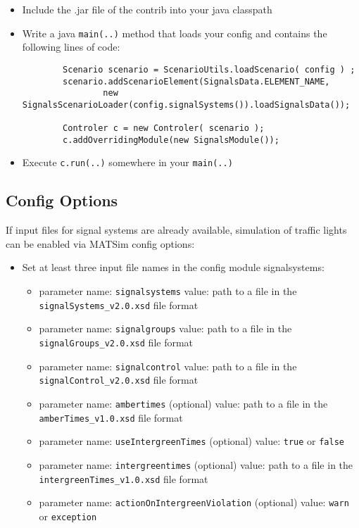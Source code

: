 \begin{itemize}
	\item Include the .jar file of the contrib into your java classpath
	\item Write a java \lstinline$main(..)$ method that loads your config and contains the following lines of code:
		\begin{lstlisting}
		Scenario scenario = ScenarioUtils.loadScenario( config ) ;
		scenario.addScenarioElement(SignalsData.ELEMENT_NAME, 
				new SignalsScenarioLoader(config.signalSystems()).loadSignalsData());

		Controler c = new Controler( scenario );
		c.addOverridingModule(new SignalsModule());
		\end{lstlisting}
	\item Execute \lstinline$c.run(..)$ somewhere in your \lstinline$main(..)$
\end{itemize}



\subsection{Config Options}

If input files for signal systems are already available, simulation of traffic lights can be enabled via MATSim config options:

\begin{itemize}
	\item Set at least three input file names in the config module signalsystems:
		\begin{itemize}
			\item parameter name: \lstinline$signalsystems$ value: path to a file in the \lstinline$signalSystems_v2.0.xsd$ file format
  		\item parameter name: \lstinline$signalgroups$ value: path to a file in the \lstinline$signalGroups_v2.0.xsd$ file format
 			\item parameter name: \lstinline$signalcontrol$ value: path to a file in the \lstinline$signalControl_v2.0.xsd$ file format
 			\item parameter name: \lstinline$ambertimes$ (optional) value: path to a file in the \lstinline$amberTimes_v1.0.xsd$ file format
			\item parameter name: \lstinline$useIntergreenTimes$ (optional) value: \lstinline$true$ or \lstinline$false$
			\item parameter name: \lstinline$intergreentimes$ (optional) value: path to a file in the \lstinline$intergreenTimes_v1.0.xsd$ file format
			\item parameter name: \lstinline$actionOnIntergreenViolation$ (optional) value: \lstinline$warn$ or \lstinline$exception$
		\end{itemize}
\end{itemize}




